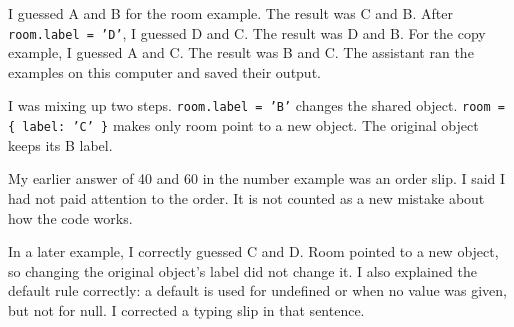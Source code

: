 \documentclass[
  10pt,
  a4paper,
]{article}
\begin{document}
I guessed A and B for the room example. The result was C and B. After
\texttt{room.\allowbreak{}label = 'D'}, I guessed D and C. The result
was D and B. For the copy example, I guessed A and C. The result was B
and C. The assistant ran the examples on this computer and saved their
output.

I was mixing up two steps. \texttt{room.\allowbreak{}label = 'B'}
changes the shared object. \texttt{room = \{ label:\allowbreak{} 'C' \}}
makes only room point to a new object. The original object keeps its B
label.

My earlier answer of 40 and 60 in the number example was an order slip.
I said I had not paid attention to the order. It is not counted as a new
mistake about how the code works.

In a later example, I correctly guessed C and D. Room pointed to a new
object, so changing the original object's label did not change it. I
also explained the default rule correctly: a default is used for
undefined or when no value was given, but not for null. I corrected a
typing slip in that sentence.
\end{document}
